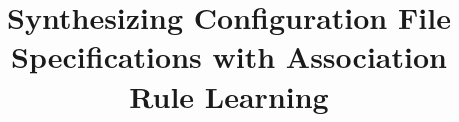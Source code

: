 \documentclass{llncs}
\begin{document}
\setlength{\pdfpageheight}{\paperheight}
\setlength{\pdfpagewidth}{\paperwidth}





\title{Synthesizing Configuration File Specifications with Association
Rule Learning}

\author{\xspace}
\institute{\xspace}

\maketitle
\vspace{-45pt}




 









\end{document}
